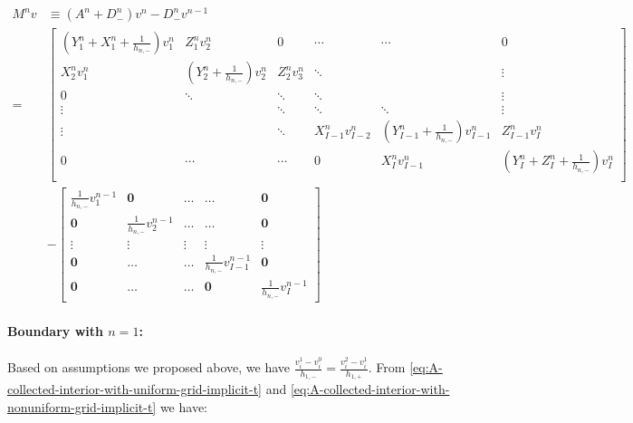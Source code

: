 \documentclass[11pt]{etk-article}
\begin{document}
\begin{align}
M^n v &\equiv \left(A^n+D_{-}^{n}\right)v^n-D_{-}^n v^{n-1}\\
=& \begin{bmatrix}
\left(Y^n_1 + X^n_1+\frac{1}{h_{n,-}}\right)v_1^{n} & Z^n_1v_2^{n} & 0  & \cdots & \cdots & 0 \\
X^n_2v_1^n & \left(Y^n_2+\frac{1}{h_{n,-}}\right)v_2^n & Z^n_2v_3^{n} & \ddots& & \vdots \\
0 & \ddots & \ddots & \ddots &  & \vdots \\
\vdots &  & \ddots & \ddots & \ddots  & \vdots \\
\vdots & & \ddots & X^n_{I-1}v_{I-2}^n & \left(Y^n_{I-1}+\frac{1}{h_{n,-}}\right)v_{I-1}^n  & Z^n_{I-1}v_I^n \\
0 & \cdots & \cdots & 0 & X^n_Iv_{I-1}^{n} & \left(Y^n_I+Z^n_I+\frac{1}{h_{n,-}}\right)v_{I}^{n}\\
\end{bmatrix} \nonumber \\
&-\begin{bmatrix} \frac{1}{h_{n,-}}v_1^{n-1} &\mathbf{0} &\ldots &\ldots &\mathbf{0}\\
\mathbf{0} & \frac{1}{h_{n,-}}v_2^{n-1} & \ldots &\ldots &\mathbf{0}\\
\vdots & \vdots & \vdots &\vdots & \vdots\\
\mathbf{0} & \ldots & \ldots & \frac{1}{h_{n,-}} v_{I-1}^{n-1} &\mathbf{0}\\
\mathbf{0} & \ldots &\ldots & \mathbf{0} & \frac{1}{h_{n,-}} v_{I}^{n-1} \end{bmatrix}
\end{align}

\paragraph{Boundary with $n=1$:} Based on assumptions we proposed above, we have $\frac{v_i^1-v_i^0}{h_{1, -}} = \frac{v_i^2-v_i^1}{h_{1, +}}$. From \cref{eq:A-collected-interior-with-uniform-grid-implicit-t} and \cref{eq:A-collected-interior-with-nonuniform-grid-implicit-t} we have:
 
\end{document}
